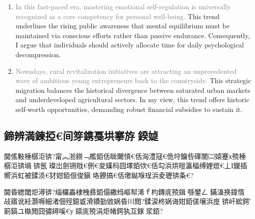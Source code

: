 ﻿\documentclass[lang=cn,11pt]{elegantbook}
\begin{document}
\begin{enumerate}
    \item \textcolor{gray}{In this fast-paced era, mastering emotional self-regulation is universally recognized as a core competency for personal well-being.} This trend underlines the rising public awareness that mental equilibrium must be maintained via conscious efforts rather than passive endurance. Consequently, I argue that individuals should actively allocate time for daily psychological decompression.
    \item \textcolor{gray}{Nowadays, rural revitalization initiatives are attracting an unprecedented wave of ambitious young entrepreneurs back to the countryside.} This strategic migration balances the historical divergence between saturated urban markets and underdeveloped agricultural sectors. In my view, this trend offers historic self-worth opportunities, demanding robust financial subsidies to sustain it.
\end{enumerate}

\subsection{鍗辨満鍊掗€间笌鎸戞垬搴斿鍨媫}

閫傜敤棰樼洰锛?甯︽湁鐒﹁檻銆佸眬闄愩€佸洶澧冦€佹垨鑰呰礋闈㈡媴蹇х殑棰樼洰锛堝锛氬璨岀劍铏戙€侀€夋嫨杩囧墿銆佽€佸勾浜烘暟瀛楅缚娌熴€丄I鍐插嚮浜虹被鍒涢€犲姏銆佷俊鎭垎鐐搞€佸墽鐑堢珵浜夌瓑锛夈€?

閫昏緫閾炬潯锛?缁欏畾棣栧彞銆傝繖绉嶇幇浠ｆ枃鏄庣殑鍓綔鐢ㄥ鏋滀换鍏惰敁寤讹紝灏嗕細渚佃殌鎴戜滑鐨勭敓娲昏川閲?鍒涙柊娲诲姏銆傞壌浜庢锛屽綋鍔′箣鎬ユ槸閲囧彇鐞嗘€у鎱庣殑涓炬帾鍔犱互鎵浆銆?
\end{document}

